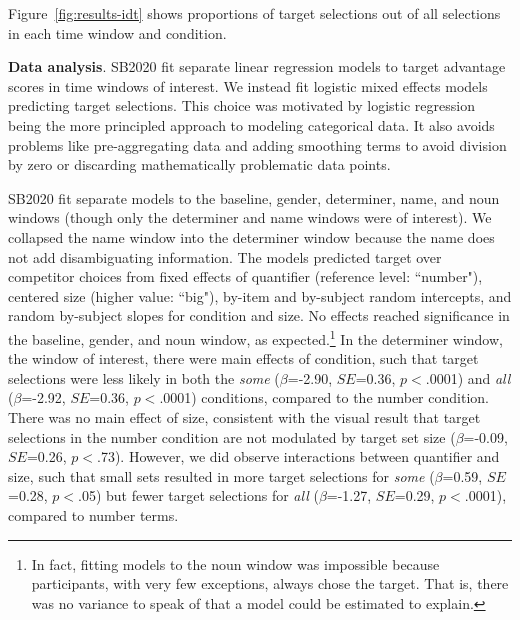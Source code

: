 \documentclass[10pt,letterpaper]{article}
\newcommand{\figref}[1]{Figure~\ref{#1}}
\newcommand{\jd}[1]{\textcolor{Red}{\textbf{[jd: #1]}}}
\begin{document}

\figref{fig:results-idt} shows proportions of target selections out of all selections in each time window and condition. 


\textbf{Data analysis}. SB2020 fit separate linear regression models to target advantage scores in time windows of interest. We instead fit logistic mixed effects models predicting target selections. This choice was motivated by logistic regression being the more principled approach to modeling categorical data. It also avoids problems like pre-aggregating data and adding smoothing terms to avoid division by zero or discarding mathematically problematic data points. %

SB2020 fit separate models to the baseline, gender, determiner, name, and noun windows (though only the determiner and name windows were of interest). We collapsed the name window into the determiner window because the name does not add disambiguating information. The models predicted target over competitor choices from fixed effects of quantifier (reference level: ``number"), centered size (higher value: ``big"), by-item and by-subject random intercepts, and random by-subject slopes for condition and size. No effects reached significance in the baseline, gender, and noun window, as expected.\footnote{In fact, fitting models to the noun window was impossible because participants, with very few exceptions, always chose the target. That is, there was no variance to speak of that a model could be estimated to explain.}  In the determiner window, the window of interest, there were main effects of condition, such that target selections were less likely in both the \emph{some} ($\beta$=-2.90, $SE$=0.36, $p<$.0001) and \emph{all} ($\beta$=-2.92, $SE$=0.36, $p<$.0001) conditions, compared to the number condition. There was no main effect of size, consistent with the visual result that target selections in the number condition are not modulated by  target set size ($\beta$=-0.09, $SE$=0.26, $p<$.73). However, we did observe interactions between quantifier and size, such that small sets resulted in more target selections for \emph{some} ($\beta$=0.59, $SE$=0.28, $p<$.05) but fewer target selections for \emph{all} ($\beta$=-1.27, $SE$=0.29, $p<$.0001), compared to number terms. 
\end{document}

